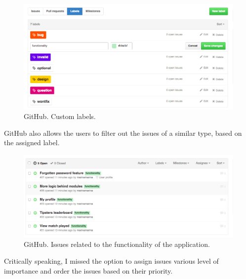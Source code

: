 \begin{figure}[H]
	\begin{center}
		\includegraphics[width=.90\linewidth,natwidth=610,natheight=642]{impl/images/githubLabelsChoice}
		\caption{GitHub. Custom labels.} \label{fig:using:githubLabelsChoice}
	\end{center}
\end{figure}

GitHub also allows the users to filter out the issues of a similar type, based on the assigned label.

\begin{figure}[H]
	\begin{center}
		\includegraphics[width=.90\linewidth,natwidth=610,natheight=642]{impl/images/githubFunctionalityIssues}
		\caption{GitHub. Issues related to the functionality of the application.} \label{fig:using:githubFunctionalityIssues}
	\end{center}
\end{figure}

Critically speaking, I missed the option to assign issues various level of importance and order the issues based on their priority.


